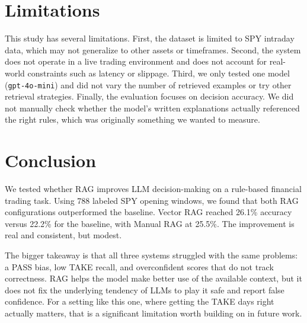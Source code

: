\documentclass{article}
\begin{document}
\section{Limitations}

This study has several limitations. First, the dataset is limited to SPY intraday data, which may not generalize to other assets or timeframes. Second, the system does not operate in a live trading environment and does not account for real-world constraints such as latency or slippage. Third, we only tested one model (\texttt{gpt-4o-mini}) and did not vary the number of retrieved examples or try other retrieval strategies. Finally, the evaluation focuses on decision accuracy. We did not manually check whether the model's written explanations actually referenced the right rules, which was originally something we wanted to measure.

\section{Conclusion}

We tested whether RAG improves LLM decision-making on a rule-based financial trading task. Using 788 labeled SPY opening windows, we found that both RAG configurations outperformed the baseline. Vector RAG reached 26.1\% accuracy versus 22.2\% for the baseline, with Manual RAG at 25.5\%. The improvement is real and consistent, but modest.

The bigger takeaway is that all three systems struggled with the same problems: a PASS bias, low TAKE recall, and overconfident scores that do not track correctness. RAG helps the model make better use of the available context, but it does not fix the underlying tendency of LLMs to play it safe and report false confidence. For a setting like this one, where getting the TAKE days right actually matters, that is a significant limitation worth building on in future work.
\end{document}
